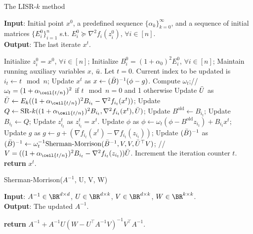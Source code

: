 \begin{algorithm}[H]
\caption{The LISR-$k$ method}
\label{alg:glins+_efficient}
\textbf{Input}: Initial point $x^0$, a predefined sequence $\{\alpha_k\}_{k=0}^{\infty}$, and a sequence of initial matrices $\{E_i^0\}_{i=1}^n$ s.t. $E_i^0 \succeq \nabla^2 f_i(z_i^0)$, $\forall i \in [n]$.\\
\textbf{Output}: The last iterate $x^t$.
\begin{algorithmic}[1]
\STATE Initialize $z_i^0 = x^0$, $\forall i \in [n]$; Initialize $B_i^0 = (1 + \alpha_0)^2 E_i^0$, $\forall i \in [n]$;
\STATE Maintain running auxiliary variables $x$, $\Bar{u}$.
\STATE Let $t=0$.
\STATE Current index to be updated is $i_t \gets t \mod n$;
\STATE Update $x^t$ as $x \gets (\Bar{B})^{-1} (\phi - g)$.
\STATE Compute $\omega_t$;// $\omega_t = (1 + \alpha_{\ceil{t/n}})^2$ if $t \mod n = 0$ and 1 otherwise
\STATE Update $\Bar{U}$ as $\Bar{U} \gets E_k ((1 + \alpha_{\ceil{t/n}})^2 B_{i_t} - \nabla^2 f_{i_t}(x^t) )$;
\STATE Update $Q \gets  \mathrm{SR}\textrm{-}k ((1 + \alpha_{\ceil{t/n}})^2 B_{i_t}, \nabla^2 f_{i_t}(x^t), \Bar{U})$;
\STATE Update $B^{\textrm{old}} \gets B_{i_t}$;
\STATE Update $B_{i_t} \gets Q$;
\STATE Update $z_{i_t}^t$ as $z_{i_t}^t = x^t$.
\STATE Update $\phi$ as $\phi \gets \omega_t (\phi - B^{\textrm{old}} z_{i_t}) + B_{i_t} x^t$;
\STATE Update $g$ as $g \gets g + (\nabla f_{i_t} (x^t) - \nabla f_{i_t} (z_{i_t}))$;
\STATE Update $(\Bar{B})^{-1}$ as $(\Bar{B})^{-1} \gets \omega_t^{-1} \mathrm{Sherman}\textrm{-} \mathrm{Morrison}(\Bar{B}^{-1}, V,  V, \Bar{U}^{\top} V )$; // $V = ((1 + \alpha_{\ceil{t/n}})^2 B_{i_t} - \nabla^2 f_{i_t}(z_{i_t})) \Bar{U}$.
\STATE Increment the iteration counter $t$.
\ENDWHILE
\STATE \textbf{return} $x^t$.
\end{algorithmic}
\end{algorithm}

\begin{algorithm}[H]
\caption{Sherman-Morrison($A^{-1}$, U, V, W)}
\label{alg:sherman_morrison}
\textbf{Input}: $A^{-1} \in \BR^{d \times d}$, $U \in \BR^{d \times k}$, $V \in \BR^{d \times k}$, $W \in \BR^{k \times k}$.\\
\textbf{Output}: The updated $A^{-1}$.
\begin{algorithmic}[1]
\STATE \textbf{return} $A^{-1} + A^{-1}U \left(W - U^{\top}A^{-1} V\right)^{-1} V^{\top} A^{-1}$.
\end{algorithmic}
\end{algorithm}